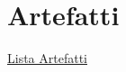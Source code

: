 \section{Artefatti}\label{artefatti}

\href{Lista\%20Artefatti\%20835be49fcf23418eacb09e755f9b0ffd.csv}{Lista
Artefatti}

